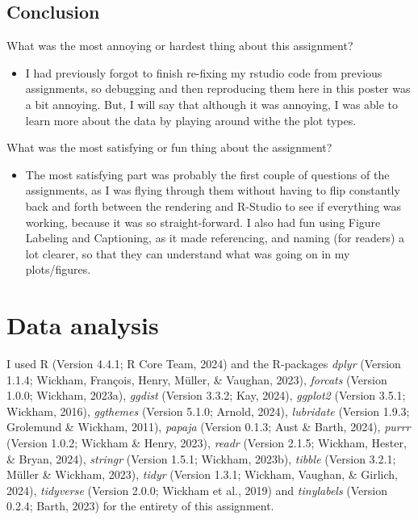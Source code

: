 \documentclass[
  man,floatsintext]{apa6}
\providecommand{\tightlist}{%
  \setlength{\itemsep}{0pt}\setlength{\parskip}{0pt}}
\begin{document}
\subsection{\texorpdfstring{Conclusion}{Conclusion }}\label{conclusion}

What was the most annoying or hardest thing about this assignment?

\begin{itemize}
\tightlist
\item
  I had previously forgot to finish re-fixing my rstudio code from previous assignments, so debugging and then reproducing them here in this poster was a bit annoying. But, I will say that although it was annoying, I was able to learn more about the data by playing around withe the plot types.
\end{itemize}

What was the most satisfying or fun thing about the assignment?

\begin{itemize}
\tightlist
\item
  The most satisfying part was probably the first couple of questions of the assignments, as I was flying through them without having to flip constantly back and forth between the rendering and R-Studio to see if everything was working, because it was so straight-forward. I also had fun using Figure Labeling and Captioning, as it made referencing, and naming (for readers) a lot clearer, so that they can understand what was going on in my plots/figures.
\end{itemize}

\section{Data analysis}\label{data-analysis}

I used R (Version 4.4.1; R Core Team, 2024) and the R-packages \emph{dplyr} (Version 1.1.4; Wickham, François, Henry, Müller, \& Vaughan, 2023), \emph{forcats} (Version 1.0.0; Wickham, 2023a), \emph{ggdist} (Version 3.3.2; Kay, 2024), \emph{ggplot2} (Version 3.5.1; Wickham, 2016), \emph{ggthemes} (Version 5.1.0; Arnold, 2024), \emph{lubridate} (Version 1.9.3; Grolemund \& Wickham, 2011), \emph{papaja} (Version 0.1.3; Aust \& Barth, 2024), \emph{purrr} (Version 1.0.2; Wickham \& Henry, 2023), \emph{readr} (Version 2.1.5; Wickham, Hester, \& Bryan, 2024), \emph{stringr} (Version 1.5.1; Wickham, 2023b), \emph{tibble} (Version 3.2.1; Müller \& Wickham, 2023), \emph{tidyr} (Version 1.3.1; Wickham, Vaughan, \& Girlich, 2024), \emph{tidyverse} (Version 2.0.0; Wickham et al., 2019) and \emph{tinylabels} (Version 0.2.4; Barth, 2023) for the entirety of this assignment.
\end{document}
